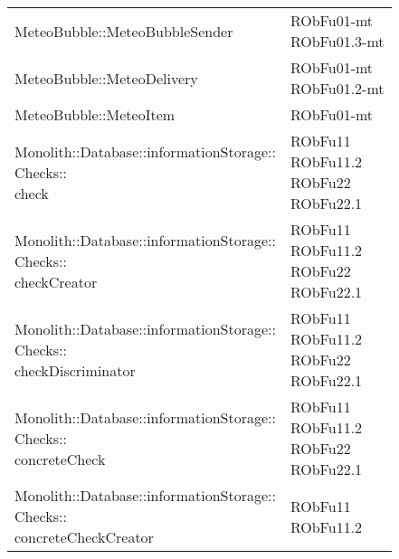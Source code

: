 \begin{center}
\begin{longtable}{|
*{1}{>{\centering\arraybackslash}p{7.5cm}|}
*{1}{>{\centering\arraybackslash}p{2.5cm}|}}
{\\}\\\hline
MeteoBubble::MeteoBubbleSender & \makecell{RObFu01-mt
\\RObFu01.3-mt
\\}\\\hline
MeteoBubble::MeteoDelivery & \makecell{RObFu01-mt
\\RObFu01.2-mt
\\}\\\hline
MeteoBubble::MeteoItem & \makecell{RObFu01-mt
\\}\\\hline
\makecell{Monolith::Database::informationStorage:: \\ \hfill Checks:: \\ \hfill check} & \makecell{RObFu11
\\RObFu11.2
\\RObFu22
\\RObFu22.1
\\}\\\hline
\makecell{Monolith::Database::informationStorage:: \\ \hfill Checks:: \\ \hfill checkCreator} & \makecell{RObFu11
\\RObFu11.2
\\RObFu22
\\RObFu22.1
\\}\\\hline
\makecell{Monolith::Database::informationStorage:: \\ \hfill Checks:: \\ \hfill checkDiscriminator} & \makecell{RObFu11
\\RObFu11.2
\\RObFu22
\\RObFu22.1
\\}\\\hline
\makecell{Monolith::Database::informationStorage:: \\ \hfill Checks:: \\ \hfill concreteCheck} & \makecell{RObFu11
\\RObFu11.2
\\RObFu22
\\RObFu22.1
\\}\\\hline
\makecell{Monolith::Database::informationStorage:: \\ \hfill Checks:: \\ \hfill concreteCheckCreator} & \makecell{RObFu11
\\RObFu11.2
}
\end{longtable}
\end{center}
